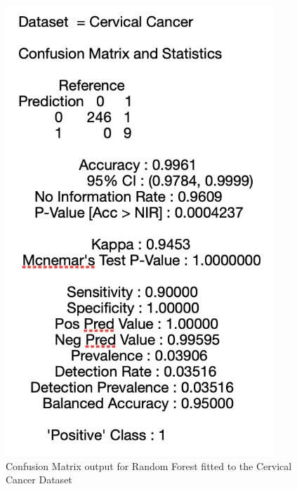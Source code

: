 \begin{figure}[!htbp]
    \centering
    \begin{minipage}{0.45\textwidth}
        \centering
        \includegraphics[width=0.9\textwidth]{ThesisTemplate/appendix/images/Chapter5Appendix/ConfusionMatrix/CervicalCancer.png} 
        \caption{Confusion Matrix output for Random Forest fitted to the Cervical Cancer Dataset}
        \label{fig:my_label}
    \end{minipage}\hfill
    \begin{minipage}{0.45\textwidth}
        \centering

\end{minipage}
\end{figure}
